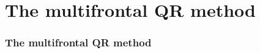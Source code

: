 \documentclass{beamer}
\begin{document}





\part{The multifrontal QR method}

\begin{frame}[plain]
  \partpage
\end{frame}


\section{The multifrontal QR method}
\end{document}

